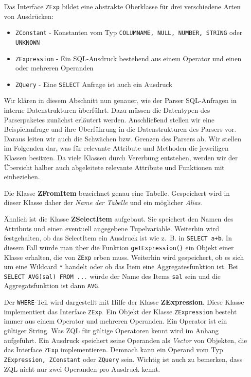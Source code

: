 Das Interface \verb|ZExp| bildet eine abstrakte Oberklasse für drei verschiedene Arten von Ausdrücken:

\begin{itemize}
\item \verb|ZConstant| - Konstanten vom Typ \verb|COLUMNAME, NULL, NUMBER, STRING| oder \verb|UNKNOWN|
\item \verb|ZExpression| - Ein SQL-Ausdruck bestehend aus einem Operator und einen oder mehreren Operanden
\item \verb|ZQuery| - Eine \verb|SELECT| Anfrage ist auch ein Ausdruck
\end{itemize}

Wir klären in diesem Abschnitt nun genauer, wie der Parser SQL-Anfragen in interne Datenstrukturen überführt.
Dazu müssen die Datentypen des Parserpaketes zunächst erläutert werden. Anschließend stellen wir eine Beispielanfrage und ihre Überführung in die Datenstrukturen des Parsers vor. Daraus leiten wir auch die Schwächen bzw. Grenzen des Parsers ab. Wir stellen im Folgenden dar, was für relevante Attribute und Methoden die jeweiligen Klassen besitzen. Da viele Klassen durch Vererbung entstehen, werden wir der Übersicht halber auch abgeleitete relevante Attribute und Funktionen mit einbeziehen.

Die Klasse \textbf{ZFromItem} bezeichnet genau eine Tabelle. Gespeichert wird in dieser Klasse daher der \textit{Name der Tabelle} und ein möglicher \textit{Alias}.

Ähnlich ist die Klasse \textbf{ZSelectItem} aufgebaut. Sie speichert den Namen des Attributs und einen eventuell angegebene Tupelvariable. Weiterhin wird festgehalten, ob das SelectItem ein Ausdruck ist wie \mbox{z. B.} in \verb|SELECT a+b|. In diesem Fall würde man über die Funktion \verb|getExpression()| ein Objekt einer Klasse erhalten, die von \verb|ZExp| erben muss. Weiterhin wird gespeichert, ob es sich um eine Wildcard \verb|*| handelt oder ob das Item eine Aggregatesfunktion ist. Bei \verb|SELECT AVG(sal) FROM ...| würde der Name des Items \verb|sal| sein und die Aggregatsfunktion ist dann \verb|AVG|. 

Der \verb|WHERE|-Teil wird dargestellt mit Hilfe der Klasse \textbf{ZExpression}. Diese Klasse implementiert das Interface \verb|ZExp|. Ein Objekt der Klasse \verb|ZExpression| besteht immer aus einem Operator und mehreren Operanden. Ein Operator ist ein gültiger String. Was ZQL für gültige Operatoren kennt wird im Anhang aufgeführt. Ein Ausdruck speichert seine Operanden als \textit{Vector} von Objekten, die das Interface \verb|ZExp| implementieren. Demnach kann ein Operand vom Typ \verb|ZExpression, ZConstant| oder \verb|ZQuery| sein.
Wichtig ist auch zu bemerken, dass ZQL nicht nur zwei Operanden pro Ausdruck kennt. 

